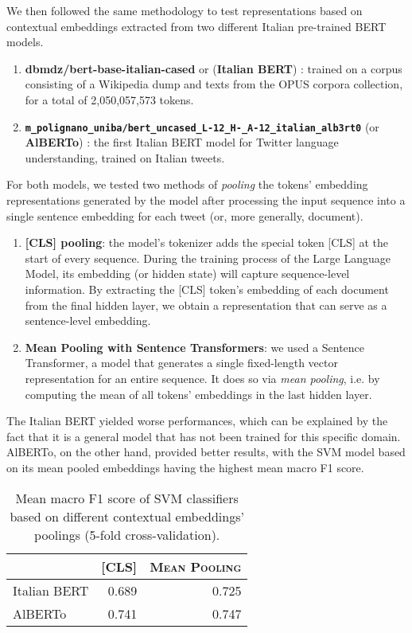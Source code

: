 We then followed the same methodology to test representations based on contextual embeddings extracted from two different Italian pre-trained BERT models.
\begin{enumerate}
    \item \textbf{dbmdz/bert-base-italian-cased} or (\textbf{Italian BERT}) \cite{italian_bert}:  trained on a corpus consisting of a Wikipedia dump and texts from the OPUS corpora collection, for a total of 2,050,057,573 tokens.
    \item \texttt{\textbf{m\_polignano\_uniba/bert\_uncased\_L{-}12\_H{-}\_A{-}12\_italian\_alb3rt0}} (or \textbf{AlBERTo}) \cite{alberto}:  the first Italian BERT model for Twitter language understanding, trained on Italian tweets.
\end{enumerate}

For both models, we tested two methods of \textit{pooling} the tokens' embedding representations generated by the model after processing the input sequence into a single sentence embedding for each tweet (or, more generally, document).
\begin{enumerate}
    \item \textbf{[CLS] pooling}: the model's tokenizer adds the special token [CLS] at the start of every sequence. During the training process of the Large Language Model, its embedding (or hidden state) will capture sequence-level information. By extracting the [CLS] token's embedding of each document from the final hidden layer, we obtain a representation that can serve as a sentence-level embedding.
    \item \textbf{Mean Pooling with Sentence Transformers}: we used a Sentence Transformer, a model that generates a single fixed-length vector representation for an entire sequence. It does so via \textit{mean pooling}, i.e. by computing the mean of all tokens' embeddings in the last hidden layer.
\end{enumerate}

The Italian BERT yielded worse performances, which can be explained by the fact that it is a general model that has not been trained for this specific domain. AlBERTo, on the other hand, provided better results, with the SVM model based on its mean pooled embeddings having the highest mean macro F1 score.
    
\begin{table}
\centering
    \begin{tabular}{lrr}
        \toprule
        & \textsc{[CLS]} & \textsc{Mean Pooling} \\
        \midrule
        Italian BERT & 0.689 & 0.725 \\
        AlBERTo & 0.741 & 0.747 \\
        \bottomrule
    \end{tabular}
    \caption{Mean macro F1 score of SVM classifiers based on different contextual embeddings' poolings (5-fold cross-validation).}
    \label{tbl:svm_f1_contextual_embs_pooling}
\end{table}

